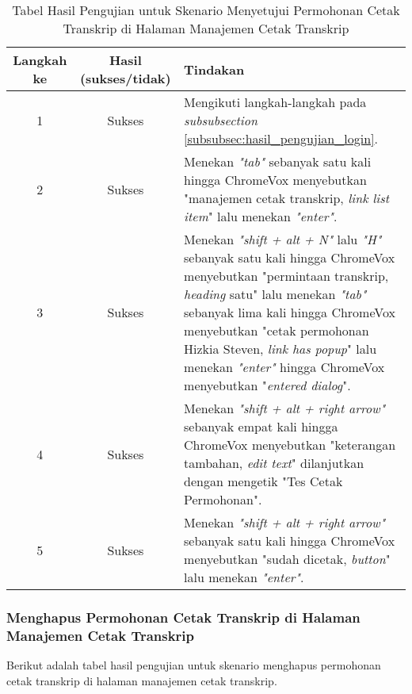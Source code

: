 \begin{table}[H]
    \centering 
    \caption{Tabel Hasil Pengujian untuk Skenario Menyetujui Permohonan Cetak Transkrip di Halaman Manajemen Cetak Transkrip}
    \label{tab:hasil_pengujian_menyetujui_permohonan_cetak_transkrip_di_halaman_manajemen_cetak_transkrip}
    \begin{tabular}{|c|c|p{10cm}|}
        \toprule
        Langkah ke & Hasil (sukses/tidak) & Tindakan \\

        \midrule
        1 & Sukses & Mengikuti langkah-langkah pada \textit{subsubsection} \ref{subsubsec:hasil_pengujian_login}. \\
        2 & Sukses & Menekan \textit{"tab"} sebanyak satu kali hingga ChromeVox menyebutkan "manajemen cetak transkrip, \textit{link list item}" lalu menekan \textit{"enter"}. \\
        3 & Sukses & Menekan \textit{"shift + alt + N"} lalu \textit{"H"} sebanyak satu kali hingga ChromeVox menyebutkan "permintaan transkrip, \textit{heading} satu" lalu menekan \textit{"tab"} sebanyak lima kali hingga ChromeVox menyebutkan "cetak permohonan Hizkia Steven, \textit{link has popup}" lalu menekan \textit{"enter"} hingga ChromeVox menyebutkan "\textit{entered dialog}". \\
        4 & Sukses & Menekan \textit{"shift + alt + right arrow"} sebanyak empat kali hingga ChromeVox menyebutkan "keterangan tambahan, \textit{edit text}" dilanjutkan dengan mengetik "Tes Cetak Permohonan". \\
        5 & Sukses & Menekan \textit{"shift + alt + right arrow"} sebanyak satu kali hingga ChromeVox menyebutkan "sudah dicetak, \textit{button}" lalu menekan \textit{"enter"}. \\ 

        \bottomrule

    \end{tabular}
\end{table}

\subsubsection{Menghapus Permohonan Cetak Transkrip di Halaman Manajemen Cetak Transkrip}
\label{subsubsec:hasil_pengujian_menghapus_permohonan_cetak_transkrip_di_halaman_manajemen_cetak_transkrip}
Berikut adalah tabel hasil pengujian untuk skenario menghapus permohonan cetak transkrip di halaman manajemen cetak transkrip.

